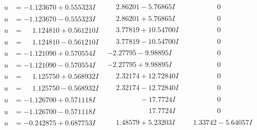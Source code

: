 \documentclass[1p]{elsarticle_modified}
\theoremstyle{definition}
\begin{document}
$$\begin{array}{c|c|c}
\begin{aligned}
u &= -1.123670 + 0.555323 I\end{aligned}
 & \phantom{-}2.86201 - 5.76865 I & \phantom{-0.000000 } 0 \\ \hline\begin{aligned}
u &= -1.123670 - 0.555323 I\end{aligned}
 & \phantom{-}2.86201 + 5.76865 I & \phantom{-0.000000 } 0 \\ \hline\begin{aligned}
u &= \phantom{-}1.124810 + 0.561210 I\end{aligned}
 & \phantom{-}3.77819 + 10.54700 I & \phantom{-0.000000 } 0 \\ \hline\begin{aligned}
u &= \phantom{-}1.124810 - 0.561210 I\end{aligned}
 & \phantom{-}3.77819 - 10.54700 I & \phantom{-0.000000 } 0 \\ \hline\begin{aligned}
u &= -1.121090 + 0.570554 I\end{aligned}
 & -2.27795 - 9.98895 I & \phantom{-0.000000 } 0 \\ \hline\begin{aligned}
u &= -1.121090 - 0.570554 I\end{aligned}
 & -2.27795 + 9.98895 I & \phantom{-0.000000 } 0 \\ \hline\begin{aligned}
u &= \phantom{-}1.125750 + 0.568932 I\end{aligned}
 & \phantom{-}2.32174 + 12.72840 I & \phantom{-0.000000 } 0 \\ \hline\begin{aligned}
u &= \phantom{-}1.125750 - 0.568932 I\end{aligned}
 & \phantom{-}2.32174 - 12.72840 I & \phantom{-0.000000 } 0 \\ \hline\begin{aligned}
u &= -1.126700 + 0.571118 I\end{aligned}
 & \phantom{-0.000000 } -17.7724 I & \phantom{-0.000000 } 0 \\ \hline\begin{aligned}
u &= -1.126700 - 0.571118 I\end{aligned}
 & \phantom{-0.000000 -}17.7724 I & \phantom{-0.000000 } 0 \\ \hline\begin{aligned}
u &= -0.242875 + 0.687753 I\end{aligned}
 & \phantom{-}1.48579 + 5.23203 I & \phantom{-}1.33742 - 5.64057 I \\ \hline\begin{aligned}

\end{aligned}
\end{array}$$
\end{document}
